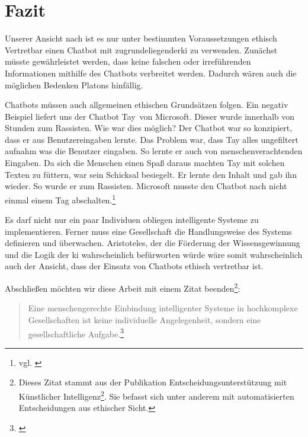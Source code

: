 \section{Fazit}
Unserer Ansicht nach ist es nur unter bestimmten Voraussetzungen ethisch Vertretbar einen Chatbot mit zugrundeliegender\ac{ki} zu verwenden.
Zunächst müsste gewährleistet werden, dass keine falschen oder irreführenden Informationen mithilfe des Chatbots verbreitet werden. Dadurch wären auch die möglichen Bedenken Platons hinfällig. 

Chatbots müssen auch allgemeinen ethischen Grundsätzen folgen. Ein negativ Beispiel liefert uns der Chatbot \glqq Tay\grqq\ von Microsoft. Dieser wurde innerhalb von Stunden zum Rassisten. Wie war dies möglich? Der Chatbot war so konzipiert, dass er aus Benutzereingaben lernte. Das Problem war, dass Tay alles ungefiltert aufnahm was die Benutzer eingaben. So lernte er auch von menschenverachtenden Eingaben. Da sich die Menschen einen Spaß daraus machten Tay mit solchen Texten zu \glqq füttern\grqq, war sein Schicksal besiegelt. Er lernte den Inhalt und gab ihn wieder. So wurde er zum Rassisten. Microsoft musste den Chatbot nach nicht einmal einem Tag abschalten.\footnote{vgl. \cite{TaySpiegel}} 

Es darf nicht nur ein paar Individuen obliegen intelligente Systeme zu implementieren. Ferner muss eine Gesellschaft die Handlungsweise des Systems definieren und überwachen. 
Aristoteles, der die Förderung der Wissensgewinnung und die Logik der \ac{ki} wahrscheinlich befürworten würde wäre somit wahrscheinlich auch der Ansicht, dass der Einsatz von Chatbots ethisch vertretbar ist.

Abschließen möchten wir diese Arbeit mit einem Zitat beenden\footnote{Dieses Zitat stammt aus der Publikation \glqq Entscheidungsunterstützung mit Künstlicher Intelligenz\grqq\footnote{vgl. \cite{Bitkom}}. Sie befasst sich unter anderem mit automatisierten Entscheidungen aus ethischer Sicht.}:
\begin{quote}
	 \glqq Eine menschengerechte Einbindung intelligenter Systeme in hochkomplexe Gesellschaften ist keine individuelle Angelegenheit, sondern eine gesellschaftliche Aufgabe.\grqq\footnote{\cite{BitkomZitat}}
\end{quote}
